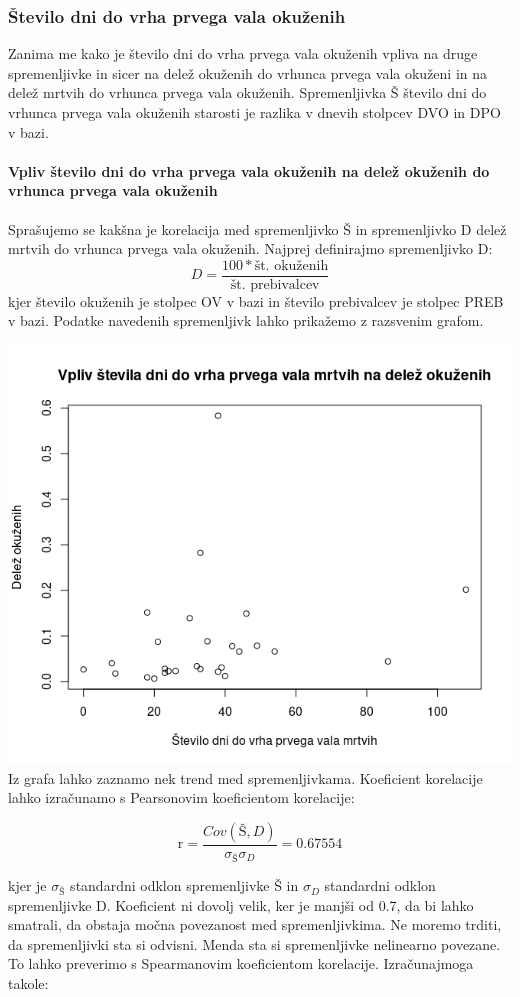 \documentclass[a4paper,11pt]{article}
\begin{document}
\subsubsection{Število dni do vrha prvega vala okuženih}

Zanima me kako je število dni do vrha prvega vala okuženih vpliva na druge spremenljivke in sicer na delež okuženih do vrhunca prvega vala okuženi in na delež mrtvih do vrhunca prvega vala okuženih. Spremenljivka Š število dni do vrhunca prvega vala okuženih starosti je razlika v dnevih
stolpcev DVO in DPO v bazi.

\paragraph{Vpliv število dni do vrha prvega vala okuženih na delež okuženih do vrhunca prvega vala okuženih}
Sprašujemo se kakšna je korelacija med spremenljivko Š in spremenljivko D delež mrtvih do vrhunca prvega vala okuženih. Najprej definirajmo spremenljivko D:
\[D = \frac{100 * \text{št. okuženih}}{\text{št. prebivalcev}}\]
kjer število okuženih je stolpec OV v bazi in število prebivalcev je stolpec PREB v bazi. Podatke navedenih spremenljivk lahko prikažemo z razsvenim grafom.

\includegraphics[scale=0.6]{vpliv_st_dni_do_peaka_mrtvih_na_delez_okuzencev}
Iz grafa lahko zaznamo nek trend med spremenljivkama. Koeficient korelacije lahko izračunamo s Pearsonovim koeficientom korelacije:

\begin{center}
\[\text{r} = \frac{Cov(Š,D)}{\sigma_{Š} \sigma_{D}} = 0.67554\]
\end{center} 
kjer je \(\sigma_{Š}\) standardni odklon spremenljivke Š in \(\sigma_{D}\) standardni odklon spremenljivke D. Koeficient ni dovolj velik, ker je manjši od 0.7, da bi lahko smatrali, da obstaja močna povezanost med spremenljivkima. Ne moremo trditi, da spremenljivki sta si odvisni. Menda sta si spremenljivke nelinearno povezane. To lahko preverimo s Spearmanovim koeficientom korelacije. Izračunajmoga takole: 
\end{document}
